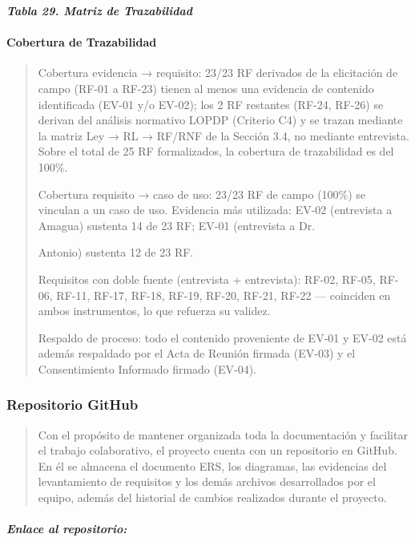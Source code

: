 \documentclass[
]{article}
\begin{document}
\protect{}\label{_bookmark113}{}\emph{\textbf{Tabla 29.
Matriz de Trazabilidad}}

\paragraph{Cobertura de Trazabilidad}\label{cobertura-de-trazabilidad}

\begin{quote}
Cobertura evidencia → requisito: 23/23 RF derivados de la elicitación de
campo (RF-01 a RF-23) tienen al menos una evidencia de contenido
identificada (EV-01 y/o EV-02); los 2 RF restantes (RF-24, RF-26) se
derivan del análisis normativo LOPDP (Criterio C4) y se trazan mediante
la matriz Ley → RL → RF/RNF de la Sección 3.4, no mediante entrevista.
Sobre el total de 25 RF formalizados, la cobertura de trazabilidad es
del 100\%.

Cobertura requisito → caso de uso: 23/23 RF de campo (100\%) se vinculan
a un caso de uso. Evidencia más utilizada: EV-02 (entrevista a Amagua)
sustenta 14 de 23 RF; EV-01 (entrevista a Dr.

Antonio) sustenta 12 de 23 RF.

Requisitos con doble fuente (entrevista + entrevista): RF-02, RF-05,
RF-06, RF-11, RF-17, RF-18, RF-19, RF-20, RF-21, RF-22 --- coinciden en
ambos instrumentos, lo que refuerza su validez.

Respaldo de proceso: todo el contenido proveniente de EV-01 y EV-02 está
además respaldado por el Acta de Reunión firmada (EV-03) y el
Consentimiento Informado firmado (EV-04).
\end{quote}

\subsubsection{Repositorio GitHub}\label{repositorio-github}

\begin{quote}
Con el propósito de mantener organizada toda la documentación y
facilitar el trabajo colaborativo, el proyecto cuenta con un repositorio
en GitHub. En él se almacena el documento ERS, los diagramas, las
evidencias del levantamiento de requisitos y los demás archivos
desarrollados por el equipo, además del historial de cambios realizados
durante el proyecto.
\end{quote}

\subparagraph{Enlace al repositorio:}\label{enlace-al-repositorio}
\end{document}
